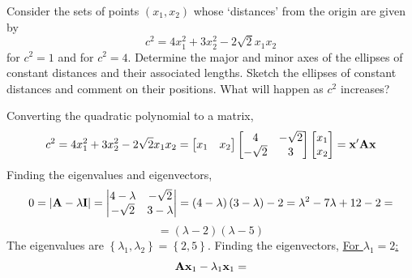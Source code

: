         Consider the sets of points $\left(x_1, x_2\right)$ whose `distances' from the origin are given by
        \[
            c^2 = 4x_1^2 + 3x_2^2 - 2\sqrt{2}x_1x_2
        \]
        for $c^2 = 1$ and for $c^2 = 4$. Determine the major and minor axes of the ellipses of constant
        distances and their associated lengths. Sketch the ellipses of constant distances and
        comment on their positions. What will happen as $c^2$ increases?
        \newline
        \par
        Converting the quadratic polynomial to a matrix,
        \[
            c^2 = 4x_1^2 + 3x_2^2 - 2\sqrt{2}x_1x_2
            =
            \begin{bmatrix}
                x_1 & x_2
            \end{bmatrix}
            \begin{bmatrix}
                4 & -\sqrt{2} \\
                -\sqrt{2} & 3
            \end{bmatrix}
            \begin{bmatrix}
                x_1 \\
                x_2
            \end{bmatrix}
            =
            \bold{x}^\prime\bold{A}\bold{x}
        \]
        Finding the eigenvalues and eigenvectors,
        \[
            0 = \left|\bold{A} - \lambda\bold{I}\right|
            =
            \left|
            \begin{matrix}
                4-\lambda & -\sqrt{2} \\
                -\sqrt{2} & 3-\lambda
            \end{matrix}
            \right|
            =
            \left(4-\lambda\right)\left(3-\lambda\right) - 2
            =
            \lambda^2 -7\lambda + 12 - 2 
            =
        \]
        \[
            =
            \left(\lambda-2\right)\left(\lambda-5\right)
        \]
        The eigenvalues are $\left\{\lambda_1, \lambda_2\right\} = \left\{2, 5\right\}$.
        Finding the eigenvectors,
        \newline
        \underline{For $\lambda_1 = 2$:}
        \[
            \bold{A}\bold{x}_1 - \lambda_1\bold{x}_1
            =
        \]
